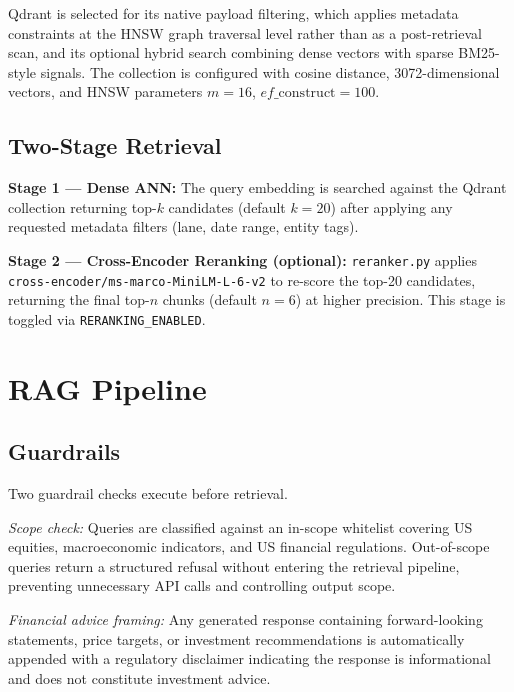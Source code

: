 \documentclass[10pt,a4paper,twocolumn]{article}
\begin{document}
Qdrant is selected for its native payload filtering, which applies metadata constraints at
the HNSW graph traversal level rather than as a post-retrieval scan, and its optional hybrid
search combining dense vectors with sparse BM25-style signals. The collection is configured
with cosine distance, 3072-dimensional vectors, and HNSW parameters $m = 16$,
$ef\_\mathrm{construct} = 100$.

\subsection{Two-Stage Retrieval}

\textbf{Stage 1 --- Dense ANN:} The query embedding is searched against the Qdrant
collection returning top-$k$ candidates (default $k = 20$) after applying any requested
metadata filters (lane, date range, entity tags).

\textbf{Stage 2 --- Cross-Encoder Reranking (optional):} \texttt{reranker.py} applies
\texttt{cross-encoder/ms-marco-MiniLM-L-6-v2} to re-score the top-20 candidates, returning
the final top-$n$ chunks (default $n = 6$) at higher precision. This stage is toggled via
\texttt{RERANKING\_ENABLED}.

\section{RAG Pipeline}

\subsection{Guardrails}

Two guardrail checks execute before retrieval.

\textit{Scope check:} Queries are classified against an in-scope whitelist covering US
equities, macroeconomic indicators, and US financial regulations. Out-of-scope queries
return a structured refusal without entering the retrieval pipeline, preventing unnecessary
API calls and controlling output scope.

\textit{Financial advice framing:} Any generated response containing forward-looking
statements, price targets, or investment recommendations is automatically appended with a
regulatory disclaimer indicating the response is informational and does not constitute
investment advice.
\end{document}
